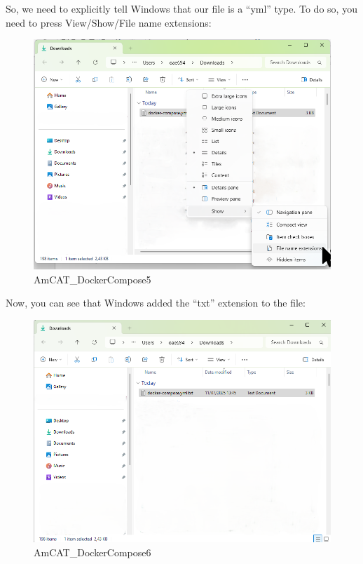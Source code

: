 \documentclass[
  letterpaper,
  DIV=11,
  numbers=noendperiod]{scrreprt}
\begin{document}
So, we need to explicitly tell Windows that our file is a ``yml'' type.
To do so, you need to press View/Show/File name extensions:

\begin{figure}[H]

{\centering \includegraphics[width=6.25in,height=\textheight]{media/amcat-2.1.2_7.png}

}

\caption{AmCAT\_DockerCompose5}

\end{figure}%

Now, you can see that Windows added the ``txt'' extension to the file:

\begin{figure}[H]

{\centering \includegraphics[width=6.25in,height=\textheight]{media/amcat-2.1.2_8.png}

}

\caption{AmCAT\_DockerCompose6}

\end{figure}%
\end{document}
